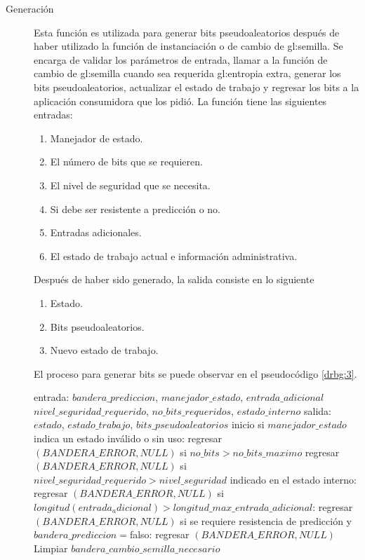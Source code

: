 \begin{description}
  \item [Generación] Esta función es utilizada para generar bits
    pseudoaleatorios después de haber utilizado la función de instanciación o
    de cambio de \gls{gl:semilla}. Se encarga de validar los parámetros de
    entrada, llamar a la función de cambio de \gls{gl:semilla} cuando sea
    requerida \gls{gl:entropia} extra, generar los bits pseudoaleatorios,
    actualizar el estado de trabajo y regresar los bits a la aplicación
    consumidora que los pidió. La función tiene las siguientes entradas:
    \begin{enumerate}
      \item Manejador de estado.
      \item El número de bits que se requieren.
      \item El nivel de seguridad que se necesita.
      \item Si debe ser resistente a predicción o no.
      \item Entradas adicionales.
      \item El estado de trabajo actual e información administrativa.
    \end{enumerate}
    Después de haber sido generado, la salida consiste en lo siguiente
    \begin{enumerate}
      \item Estado.
      \item Bits pseudoaleatorios.
      \item Nuevo estado de trabajo.
    \end{enumerate}
    El proceso para generar bits se puede observar en el pseudocódigo
    \ref{drbg:3}.
\begin{pseudocodigo}[caption={DRBG, generación.}, label={drbg:3}]
  entrada:  $bandera\_prediccion$, $manejador\_estado$, $entrada\_adicional$
            $nivel\_seguridad\_requerido$, $no\_bits\_requeridos$, $estado\_interno$
  salida:   $estado$, $estado\_trabajo$, $bits\_pseudoaleatorios$
  inicio
    si $manejador\_estado$ indica un estado inválido o sin uso:
      regresar $(BANDERA\_ERROR, NULL)$
    si $no\_bits > no\_bits\_maximo$
      regresar $(BANDERA\_ERROR, NULL)$
    si $nivel\_seguridad\_requerido > nivel\_seguridad$ indicado en el estado interno:
      regresar $(BANDERA\_ERROR, NULL)$
    si $longitud(entrada_adicional) > longitud\_max\_entrada\_adicional$:
      regresar $(BANDERA\_ERROR, NULL)$
    si se requiere resistencia de predicción y $bandera\_prediccion=$falso:
      regresar $(BANDERA\_ERROR, NULL)$
    Limpiar $bandera\_cambio\_semilla\_necesario$

\end{pseudocodigo}
\end{description}
